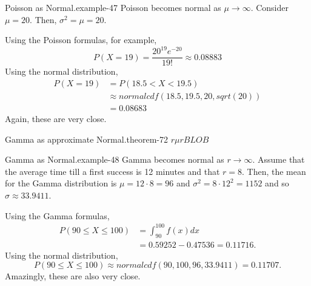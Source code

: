 \documentclass[10pt,]{book}
\numberwithin{equation}{section}
\newcommand{\lt}{<}
\begin{document}
\begin{example}{Poisson as Normal.}{example-47}%
\hypertarget{p-1234}{}%
Poisson becomes normal as \(\mu \rightarrow \infty\).  Consider \(\mu = 20\).  Then, \(\sigma^2 = \mu = 20\).%
\par
\hypertarget{p-1235}{}%
Using the Poisson formulas, for example,%
\begin{equation*}
P( X = 19 ) = \frac{20^{19} e^{-20}}{19!} \approx 0.08883
\end{equation*}
Using the normal distribution,%
\begin{align*}
P( X = 19 ) & = P( 18.5 \lt X \lt 19.5) \\
& \approx normalcdf(18.5,19.5,20,sqrt(20)) \\
& = 0.08683
\end{align*}
Again, these are very close.%
\end{example}
\begin{theorem}{Gamma as approximate Normal.}{}{theorem-72}%
\(r \mu\)\(r BLOB\)\end{theorem}
\begin{example}{Gamma as Normal.}{example-48}%
\hypertarget{p-1236}{}%
Gamma becomes normal as \(r \rightarrow \infty\).  Assume that the average time till a first success is 12 minutes and that \(r = 8\).  Then, the mean for the Gamma distribution is \(\mu = 12 \cdot 8 = 96\) and \(\sigma^2 = 8 \cdot 12^2 = 1152\) and so \(\sigma \approx 33.9411\).%
\par
\hypertarget{p-1237}{}%
Using the Gamma formulas,%
\begin{align*}
P( 90 \le X \le 100 ) & = \int_{90}^{100} f(x) dx \\
& = 0.59252 - 0.47536 = 0.11716.
\end{align*}
Using the normal distribution,%
\begin{equation*}
P( 90 \le X \le 100) \approx normalcdf(90,100,96,33.9411) = 0.11707.
\end{equation*}
Amazingly, these are also very close.%
\end{example}
\end{document}
